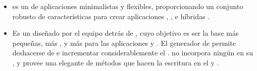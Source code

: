 \begin{itemize}
			\item
				\textbf{\expressjsNAME} es un \frameworkPC de aplicaciones \webINT \nodejsNAME minimalistas y flexibles, proporcionando un conjunto robusto de características  para crear aplicaciones \webINT \single, \multipage, e híbridas \cite{online_technology_expressjs_officialsite}.

			\item
				\textbf{\koaNAME} Es un \frameworkPC \webINT diseñado por el equipo detrás de \expressjsNAME, cuyo objetivo es ser la base más pequeñas, más \expressiveQA, y más \robustQA para las aplicaciones \webINT y \apisAS. El generador de \koaNAME permite deshacerse de \callbacksPL e incrementar considerablemente el \errorHandlingPL. \koaNAME no incorpora ningún \middlewareAS en su \coreAS, y provee una elegante \suitePC de métodos que hacen la escritura en el \serverAS \fastQA y \enjoyableQA \cite{online_technology_koa_officialsite}.
		\end{itemize}

